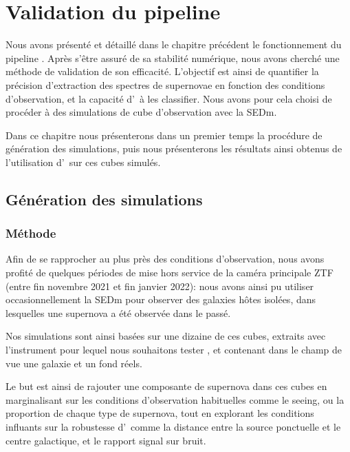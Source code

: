 \documentclass[../main/main.tex]{subfiles}
\begin{document}
\dominitoc
\faketableofcontents
\setcounter{chapter}{7}
\chapter{Validation du pipeline
  \hypergal}\label{ch:simu}

\minitoc
\vspace{2cm}
Nous avons présenté et détaillé dans le chapitre précédent le
fonctionnement du pipeline \hypergal. Après s'être assuré de sa
stabilité numérique, nous avons cherché une méthode de validation de son
efficacité. L'objectif est ainsi de quantifier la précision d'extraction
des spectres de supernovae en fonction des conditions d'observation, et
la capacité d'\hypergal\ à les classifier.
Nous avons pour cela choisi de procéder à des simulations de cube
d'observation avec la SEDm.

Dans ce chapitre nous présenterons dans un premier temps la procédure de
génération des simulations, puis nous présenterons les résultats ainsi
obtenus de
l'utilisation d'\hypergal\ sur ces cubes simulés. 
\newpage

\section{Génération des simulations}

\subsection{Méthode}

Afin de se rapprocher au plus près des conditions d'observation, nous
avons profité de quelques périodes de mise hors service de la caméra
principale ZTF (entre fin novembre 2021 et fin janvier 2022): nous avons ainsi
pu utiliser occasionnellement la SEDm pour observer des galaxies hôtes isolées, dans
lesquelles une supernova a été observée dans le passé.

Nos simulations sont ainsi basées sur une dizaine de ces cubes, extraits
avec l'instrument pour lequel nous souhaitons tester \hypergal, et
contenant dans le champ de vue une galaxie et un fond réels.

Le but est ainsi de rajouter une composante de supernova dans ces
cubes en marginalisant sur les conditions d'observation habituelles
comme le seeing, ou la proportion de chaque type de supernova, tout en explorant
les conditions influants sur la robustesse d'\hypergal\ comme la distance
entre la source ponctuelle et le centre galactique, et le rapport signal
sur bruit.
\end{document}
